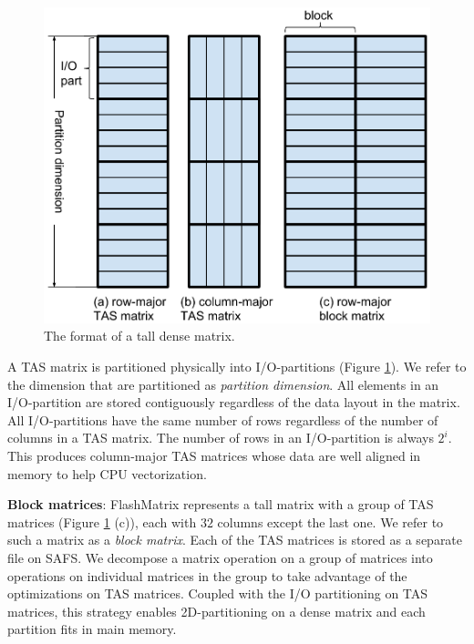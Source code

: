 \begin{figure}
	\centering
	\includegraphics[scale=0.5]{FlashMatrix_figs/dense_matrix2.pdf}
	\caption{The format of a tall dense matrix.}
	\label{fig:den_mat}
  \vspace{-12pt}
\end{figure}

A TAS matrix is partitioned physically into I/O-partitions (Figure
\ref{fig:den_mat}). We refer to the dimension that are partitioned as
\textit{partition dimension}. All elements in an I/O-partition are stored
contiguously regardless of the data layout in the matrix. All 
I/O-partitions have the same number of rows regardless of
the number of columns in a TAS matrix. The number of rows in
an I/O-partition is always $2^i$. This produces column-major TAS
matrices whose data are well aligned in memory to help CPU vectorization.

\noindent \textbf{Block matrices}:
FlashMatrix represents a tall matrix with a group of TAS matrices (Figure
\ref{fig:den_mat} (c)), each with $32$ columns except the last one. We refer
to such a matrix as a \textit{block matrix}. Each of the TAS matrices is
stored as a separate file on SAFS. We decompose a matrix operation
on a group of matrices into operations on individual matrices in the group
to take advantage of the optimizations on TAS matrices.
Coupled with the I/O partitioning on TAS matrices, this strategy enables
2D-partitioning on a dense matrix and each partition fits in main memory.

